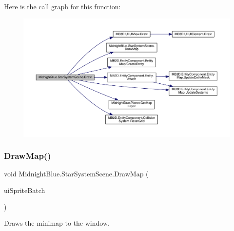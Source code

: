 Here is the call graph for this function\+:
\nopagebreak
\begin{figure}[H]
\begin{center}
\leavevmode
\includegraphics[width=350pt]{class_midnight_blue_1_1_star_system_scene_ac3d90fb8d914d15b912f5da3cc1aa8a0_cgraph}
\end{center}
\end{figure}
\hypertarget{class_midnight_blue_1_1_star_system_scene_a8ce5e552f65d43e0326644e069dc6c24}{}\label{class_midnight_blue_1_1_star_system_scene_a8ce5e552f65d43e0326644e069dc6c24} 
\subsubsection{\texorpdfstring{Draw\+Map()}{DrawMap()}}
{\footnotesize\ttfamily void Midnight\+Blue.\+Star\+System\+Scene.\+Draw\+Map (\begin{DoxyParamCaption}\item[{Sprite\+Batch}]{ui\+Sprite\+Batch }\end{DoxyParamCaption})\hspace{0.3cm}{\ttfamily [inline]}}



Draws the minimap to the window. 


